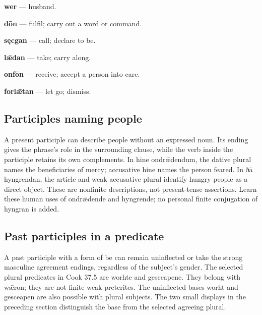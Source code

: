 \textbf{wer} — husband.

\textbf{dōn} — fulfil; carry out a word or command.

\textbf{sęcgan} — call; declare to be.

\textbf{lǣdan} — take; carry along.

\textbf{onfōn} — receive; accept a person into care.

\textbf{forlǣtan} — let go; dismiss.

\subsection*{Participles naming people}

A present participle can describe people without an expressed noun. Its ending gives the phrase’s role in the surrounding clause, while the verb inside the participle retains its own complements. In hine ondrǣdendum, the dative plural names the beneficiaries of mercy; accusative hine names the person feared. In ðā hyngrendan, the article and weak accusative plural identify hungry people as a direct object. These are nonfinite descriptions, not present-tense assertions. Learn these human uses of ondrǣdende and hyngrende; no personal finite conjugation of hyngran is added.

\subsection*{Past participles in a predicate}

A past participle with a form of be can remain uninflected or take the strong masculine agreement endings, regardless of the subject’s gender. The selected plural predicates in Cook 37.5 are worhte and gesceapene. They belong with wǣron; they are not finite weak preterites. The uninflected bases worht and gesceapen are also possible with plural subjects. The two small displays in the preceding section distinguish the base from the selected agreeing plural.

